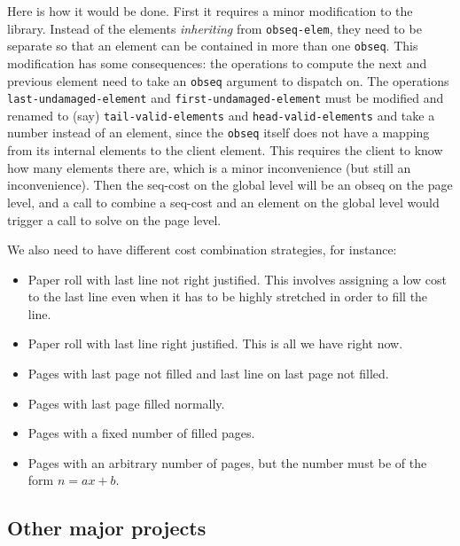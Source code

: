 Here is how it would be done.  First it requires a minor modification
to the {\obseq} library.  Instead of the elements \emph{inheriting}
from \texttt{obseq-elem}, they need to be separate so that an element
can be contained in more than one \texttt{obseq}.  This modification
has some consequences: the operations to compute the next and previous
element need to take an \texttt{obseq} argument to dispatch on.  The
operations \texttt{last-undamaged-element} and
\texttt{first-undamaged-element} must be modified and renamed to (say)
\texttt{tail-valid-elements} and \texttt{head-valid-elements} and take
a number instead of an element, since the \texttt{obseq} itself does
not have a mapping from its internal elements to the client element.
This requires the client to know how many elements there are, which is
a minor inconvenience (but still an inconvenience). Then the seq-cost
on the global level will be an obseq on the page level, and a call to
combine a seq-cost and an element on the global level would trigger a
call to solve on the page level.

We also need to have different cost combination strategies, for
instance:

\begin{itemize}
\item Paper roll with last line not right justified.  This involves
  assigning a low cost to the last line even when it has to be highly
  stretched in order to fill the line.  
\item Paper roll with last line right justified.  This is all we have
  right now.
\item Pages with last page not filled and last line on last page not
  filled. 
\item Pages with last page filled normally.
\item Pages with a fixed number of filled pages.
\item Pages with an arbitrary number of pages, but the number must be
  of the form $n = ax + b$.
\end{itemize}

\subsection{Other major projects}

